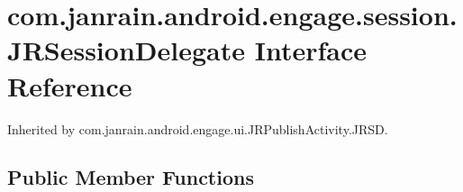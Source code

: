 \hypertarget{interfacecom_1_1janrain_1_1android_1_1engage_1_1session_1_1_j_r_session_delegate}{
\section{com.janrain.android.engage.session.JRSessionDelegate Interface Reference}
\label{interfacecom_1_1janrain_1_1android_1_1engage_1_1session_1_1_j_r_session_delegate}
}


Inherited by com.janrain.android.engage.ui.JRPublishActivity.JRSD.

\subsection*{Public Member Functions}
